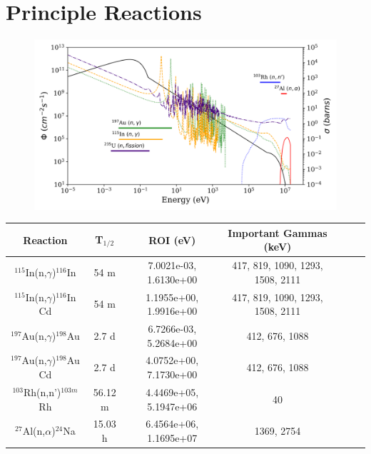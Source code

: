 \documentclass[a4paper, 11pt]{article}
\begin{document}
\newpage

\section*{Principle Reactions}


\begin{figure}[!ht]
   \centering
   \includegraphics[width=1.0\textwidth]{source/plot/amalgamated}
   \label{fig:amalgamated}
\end{figure}



\begin{table}[h]
\centering
\begin{tabular}{ |c|c|c|c|c|c|c| }
 \hline
 Reaction & T$_{1/2}$ & ROI (eV) & Important Gammas (keV) \\
 \hline
 $^{115}$In(n,$\gamma$)$^{116}$In & 54 m & 7.0021e-03, 1.6130e+00 & 417, 819, 1090, 1293, 1508, 2111 \\
 \hline
  $^{115}$In(n,$\gamma$)$^{116}$In Cd & 54 m & 1.1955e+00, 1.9916e+00 & 417, 819, 1090, 1293, 1508, 2111 \\
 \hline
 $^{197}$Au(n,$\gamma$)$^{198}$Au & 2.7 d & 6.7266e-03, 5.2684e+00 & 412, 676, 1088 \\
 \hline
 $^{197}$Au(n,$\gamma$)$^{198}$Au Cd & 2.7 d & 4.0752e+00, 7.1730e+00 & 412, 676, 1088 \\
 \hline
 $^{103}$Rh(n,n')$^{103m}$Rh & 56.12 m & 4.4469e+05, 5.1947e+06 & 40 \\
 \hline
 $^{27}$Al(n,$\alpha$)$^{24}$Na & 15.03 h & 6.4564e+06, 1.1695e+07 & 1369, 2754 \\
 \hline
\end{tabular}
\end{table}
\end{document}

